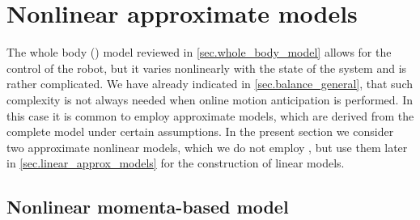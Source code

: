 \section{Nonlinear approximate models}\label{sec.nonlinear_approx_models}

The whole body () model reviewed in
\cref{sec.whole_body_model} allows for the control of the robot, but it varies
nonlinearly with the state of the system and is rather complicated. We have
already indicated in \cref{sec.balance_general}, that such complexity is not
always needed when online motion anticipation is performed. In this case it is
common to employ approximate models, which are derived from the complete model
under certain assumptions. In the present section we consider two approximate
nonlinear models, which we do not employ , but use them later in
\cref{sec.linear_approx_models} for the construction of linear models.


\subsection{Nonlinear momenta-based model}\label{sec.momenta_based_nonlinear}

